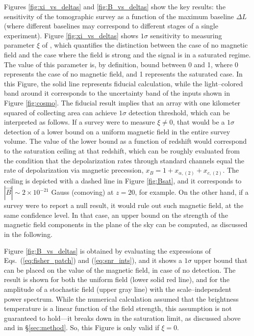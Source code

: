 Figures \ref{fig:xi_vs_deltas} and \ref{fig:B_vs_deltas} show the key results: the sensitivity of the tomographic survey as a function of the maximum baseline $\Delta L$ (where different baselines may correspond to different stages of a single experiment). Figure \ref{fig:xi_vs_deltas} shows $1\sigma$ sensitivity to measuring parameter $\xi$ of \eq{\ref{eq:saturated_P}}, which quantifies the distinction between the case of no magnetic field and the case where the field is strong and the signal is in a saturated regime. The value of this parameter is, by definition, bound between 0 and 1, where 0 represents the case of no magnetic field, and 1 represents the saturated case. In this Figure, the solid line represents fiducial calculation, while the light--colored band around it corresponds to the uncertainty band of the inputs shown in Figure \ref{fig:cosmo}. The fiducial result implies that an array with one kilometer squared of collecting area can achieve $1\sigma$ detection threshold, which can be interpreted as follows. If a survey were to measure $\xi\ne 0$, that would be a $1\sigma$ detection of a lower bound on a uniform magnetic field in the entire survey volume. The value of the lower bound as a function of redshift would correspond to the saturation ceiling at that redshift, which can be roughly evaluated from the condition that the depolarization rates through standard channels equal the rate of depolarization via magnetic precession, $x_B = 1+x_{\alpha ,(2)} +x_{c,(2)}$. The ceiling is depicted with a dashed line in Figure \ref{fig:Bsat}, and it corresponds to $|\vec B|\sim 2\times 10^{-21}$ Gauss (comoving) at $z=20$, for example.  On the other hand, if a survey were to report a null result, it would rule out such magnetic field, at the same confidence level. In that case, an upper bound on the strength of the magnetic field components in the plane of the sky can be computed, as discussed in the following. 

Figure \ref{fig:B_vs_deltas} is obtained by evaluating the expressions of Eqs.~(\ref{eq:fisher_patch}) and (\ref{eq:snr_ints}), and it shows a $1\sigma$ upper bound that can be placed on the value of the magnetic field, in case of no detection. The result is shown for both the uniform field (lower solid red line), and for the amplitude of a stochastic field (upper gray line) with the scale--independent power spectrum. While the numerical calculation assumed that the brightness temperature is a linear function of the field strength, this assumption is not guaranteed to hold---it breaks down in the saturation limit, as discussed above and in \S\ref{sec:method}. So, this Figure is only valid if $\xi=0$.

